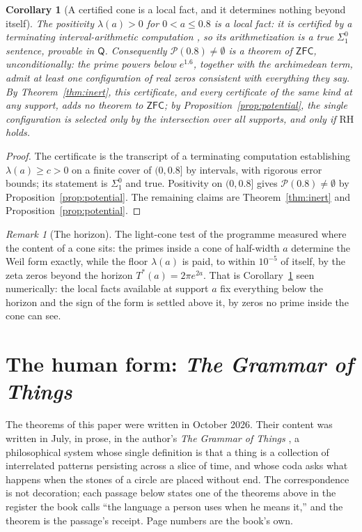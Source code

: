 \documentclass[11pt]{article}
\newtheorem{corollary}[theorem]{Corollary}
\theoremstyle{definition}
\theoremstyle{remark}
\newtheorem{remark}[theorem]{Remark}
\newcommand{\ZFC}{\mathsf{ZFC}}
\newcommand{\RA}{\mathsf{Q}}
\newcommand{\RH}{\mathrm{RH}}
\newcommand{\Sigone}{\Sigma^0_1}
\begin{document}
\begin{corollary}[A certified cone is a local fact, and it determines nothing beyond itself]\label{cor:cone}
The positivity $\lambda(a)>0$ for $0<a\le0.8$ is a local fact: it is certified by a terminating interval-arithmetic computation \cite{Zhu}, so its arithmetization is a true $\Sigone$ sentence, provable in $\RA$. Consequently $\mathcal P(0.8)\ne\emptyset$ is a theorem of $\ZFC$, unconditionally: the prime powers below $e^{1.6}$, together with the archimedean term, admit at least one configuration of real zeros consistent with everything they say. By Theorem~\ref{thm:inert}, this certificate, and every certificate of the same kind at any support, adds no theorem to $\ZFC$; by Proposition~\ref{prop:potential}, the single configuration is selected only by the intersection over all supports, and only if $\RH$ holds.
\end{corollary}

\begin{proof}
The certificate is the transcript of a terminating computation establishing $\lambda(a)\ge c>0$ on a finite cover of $(0,0.8]$ by intervals, with rigorous error bounds; its statement is $\Sigone$ and true. Positivity on $(0,0.8]$ gives $\mathcal P(0.8)\ne\emptyset$ by Proposition~\ref{prop:potential}. The remaining claims are Theorem~\ref{thm:inert} and Proposition~\ref{prop:potential}.
\end{proof}

\begin{remark}[The horizon]
The light-cone test of the programme \cite[Computation 12.5]{Folds} measured where the content of a cone sits: the primes inside a cone of half-width $a$ determine the Weil form exactly, while the floor $\lambda(a)$ is paid, to within $10^{-5}$ of itself, by the zeta zeros beyond the horizon $T^*(a)=2\pi e^{2a}$. That is Corollary~\ref{cor:cone} seen numerically: the local facts available at support $a$ fix everything below the horizon and the sign of the form is settled above it, by zeros no prime inside the cone can see.
\end{remark}

\section{The human form: \emph{The Grammar of Things}}\label{sec:book}

The theorems of this paper were written in October 2026. Their content was written in July, in prose, in the author's \emph{The Grammar of Things} \cite{Grammar}, a philosophical system whose single definition is that a thing is a collection of interrelated patterns persisting across a slice of time, and whose coda asks what happens when the stones of a circle are placed without end. The correspondence is not decoration; each passage below states one of the theorems above in the register the book calls ``the language a person uses when he means it,'' and the theorem is the passage's receipt. Page numbers are the book's own.
\end{document}
